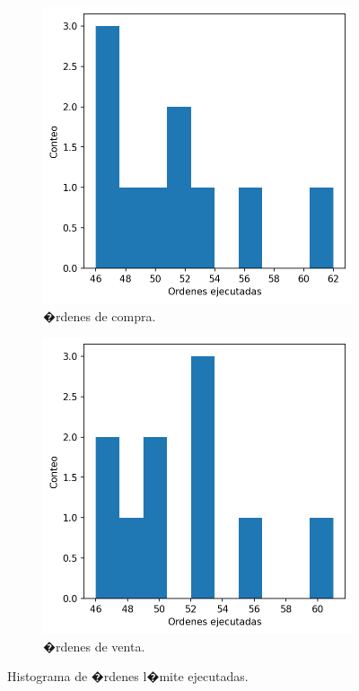 \documentclass[12pt,a4paper,spanish]{article}%
\begin{document}
\begin{figure}[H]
	\centering
	\begin{subfigure}{0.45\textwidth}
		\includegraphics[width=1\linewidth]{figuras/limit_orders_minus_executions_final}
		\caption{�rdenes de compra.}
	\end{subfigure}
	\hfill
	\begin{subfigure}{0.45\textwidth}
	\includegraphics[width=1\linewidth]{figuras/limit_orders_plus_executions_final}
	\caption{�rdenes de venta.}
\end{subfigure}
	\caption{Histograma de �rdenes l�mite ejecutadas.}
	\label{fig:limitordersminusplusexecutions}
\end{figure}
\end{document}
